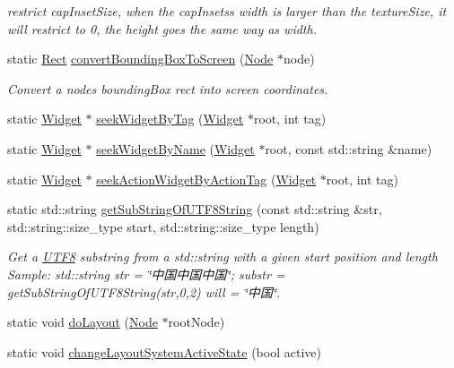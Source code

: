 \begin{DoxyCompactItemize}
\begin{DoxyCompactList}\small\item\em restrict cap\+Inset\+Size, when the cap\+Insets\textquotesingle{}s width is larger than the texture\+Size, it will restrict to 0, the height goes the same way as width. \end{DoxyCompactList}\item 
static \hyperlink{classRect}{Rect} \hyperlink{classui_1_1Helper_ada032a9b0238bc9eea83b67da612732a}{convert\+Bounding\+Box\+To\+Screen} (\hyperlink{classNode}{Node} $\ast$node)
\begin{DoxyCompactList}\small\item\em Convert a node\textquotesingle{}s bounding\+Box rect into screen coordinates. \end{DoxyCompactList}\item 
static \hyperlink{classui_1_1Widget}{Widget} $\ast$ \hyperlink{classui_1_1Helper_af3ed8c73f294b3e1887eac95ecab71e4}{seek\+Widget\+By\+Tag} (\hyperlink{classui_1_1Widget}{Widget} $\ast$root, int tag)
\item 
static \hyperlink{classui_1_1Widget}{Widget} $\ast$ \hyperlink{classui_1_1Helper_a1fefc2a4131288652eb3cd689ac36c76}{seek\+Widget\+By\+Name} (\hyperlink{classui_1_1Widget}{Widget} $\ast$root, const std\+::string \&name)
\item 
static \hyperlink{classui_1_1Widget}{Widget} $\ast$ \hyperlink{classui_1_1Helper_a5b0826f5d6ef090b55c6b021aa9bed55}{seek\+Action\+Widget\+By\+Action\+Tag} (\hyperlink{classui_1_1Widget}{Widget} $\ast$root, int tag)
\item 
static std\+::string \hyperlink{classui_1_1Helper_a311e4df45a0ec168b18ebcc9df7f4d91}{get\+Sub\+String\+Of\+U\+T\+F8\+String} (const std\+::string \&str, std\+::string\+::size\+\_\+type start, std\+::string\+::size\+\_\+type length)
\begin{DoxyCompactList}\small\item\em Get a \hyperlink{structUTF8}{U\+T\+F8} substring from a std\+::string with a given start position and length Sample\+: std\+::string str = \char`\"{}中国中国中国\char`\"{}; substr = get\+Sub\+String\+Of\+U\+T\+F8\+String(str,0,2) will = \char`\"{}中国\char`\"{}. \end{DoxyCompactList}\item 
static void \hyperlink{classui_1_1Helper_ab57b1f6c65bc4798f6ffb09f0eaae335}{do\+Layout} (\hyperlink{classNode}{Node} $\ast$root\+Node)
\item 
static void \hyperlink{classui_1_1Helper_adf5b8619840884b66927f99c9cfbc813}{change\+Layout\+System\+Active\+State} (bool active)

\end{DoxyCompactItemize}
